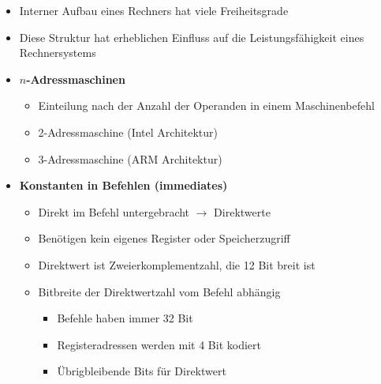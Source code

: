 \begin{itemize}
\begin{itemize}
\begin{itemize}
                    \end{itemize}
            \end{itemize}
        \item Interner Aufbau eines Rechners hat viele Freiheitsgrade
        \item Diese Struktur hat erheblichen Einfluss auf die Leistungsfähigkeit eines Rechnersystems 
        \item \textbf{$n$-Adressmaschinen}
            \begin{itemize}
                \item Einteilung nach der Anzahl der Operanden in einem Maschinenbefehl 
                \item 2-Adressmaschine (Intel Architektur)
                \item 3-Adressmaschine (ARM Architektur)
            \end{itemize}
        \item \textbf{Konstanten in Befehlen (immediates)}
            \begin{itemize}
                \item Direkt im Befehl untergebracht $\rightarrow$ Direktwerte
                \item Benötigen kein eigenes Register oder Speicherzugriff
                \item Direktwert ist Zweierkomplementzahl, die 12 Bit breit ist 
                \item Bitbreite der Direktwertzahl vom Befehl abhängig
                    \begin{itemize}
                        \item Befehle haben immer 32 Bit
                        \item Registeradressen werden mit 4 Bit kodiert
                        \item Übrigbleibende Bits für Direktwert
                    \end{itemize}
            \end{itemize}
    \end{itemize}

